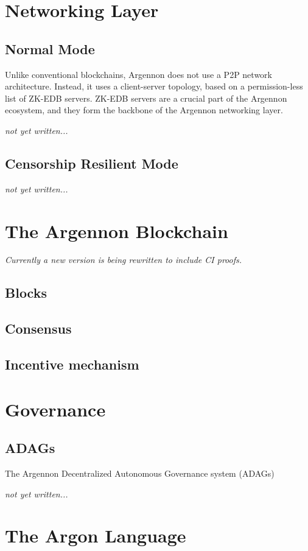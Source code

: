 \documentclass[11pt, a4paper]{report}
\newcommand{\note}[1] {
    \begin{tcolorbox}[colframe=white,colback=white]
        \emph{#1}
    \end{tcolorbox}
}
\begin{document}
    \chapter{Networking Layer}\label{ch:networking}


    \section{Normal Mode}\label{sec:normal-mode}
    Unlike conventional blockchains, Argennon does not use a P2P network architecture. Instead, it uses a
    client-server topology, based on a permission-less list of ZK-EDB servers. ZK-EDB servers are a
    crucial part of the Argennon ecosystem, and they form the backbone of the Argennon networking layer.
    \note{not yet written...}


    \section{Censorship Resilient Mode}\label{sec:cens-res-mode}
    \note{not yet written...}


    \chapter{The Argennon Blockchain}\label{ch:argennon-blockchain}
    \note{Currently a new version is being rewritten to include CI proofs.}

    \section{Blocks}\label{sec:blocks}
    


    \section{Consensus}\label{sec:consensus}
    

    


    \section{Incentive mechanism}\label{sec:incentive-mechanism}
    


    \chapter{Governance}\label{ch:governance}


    \section{ADAGs}\label{sec:adags}
    The Argennon Decentralized Autonomous Governance system (ADAGs)
    \note{not yet written...}


    \chapter{The Argon Language}\label{ch:argon-lang}
    
\end{document}
